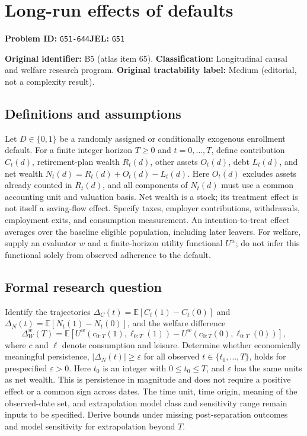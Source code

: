 \documentclass[11pt,a4paper]{article}
\begin{document}
\section*{Long-run effects of defaults}
\textbf{Problem ID:} \texttt{G51-644}\quad \textbf{JEL:} \texttt{G51}\par
\label{problem:OP-0065}
\label{atlas:prob:B5}

\noindent\textbf{Original identifier:} B5 (atlas item 65). \textbf{Classification:} Longitudinal causal and welfare research program. \textbf{Original tractability label:} Medium (editorial, not a complexity result).

\subsection*{Definitions and assumptions}

Let $D\in\{0,1\}$ be a randomly assigned or conditionally exogenous enrollment default. For a finite integer horizon $T\geq0$ and $t=0,\ldots,T$, define contribution $C_t(d)$, retirement-plan wealth $R_t(d)$, other assets $O_t(d)$, debt $L_t(d)$, and net wealth $N_t(d)=R_t(d)+O_t(d)-L_t(d)$. Here $O_t(d)$ excludes assets already counted in $R_t(d)$, and all components of $N_t(d)$ must use a common accounting unit and valuation basis. Net wealth is a stock; its treatment effect is not itself a saving-flow effect. Specify taxes, employer contributions, withdrawals, employment exits, and consumption measurement. An intention-to-treat effect averages over the baseline eligible population, including later leavers. For welfare, supply an evaluator $w$ and a finite-horizon utility functional $U^w$; do not infer this functional solely from observed adherence to the default.

\subsection*{Formal research question}

Identify the trajectories $\Delta_C(t)=\mathbb E[C_t(1)-C_t(0)]$ and $\Delta_N(t)=\mathbb E[N_t(1)-N_t(0)]$, and the welfare difference
\[
\Delta_W^w(T)=\mathbb E[U^w(c_{0:T}(1),\ell_{0:T}(1))-U^w(c_{0:T}(0),\ell_{0:T}(0))],
\]
where $c$ and $\ell$ denote consumption and leisure. Determine whether economically meaningful persistence, $|\Delta_N(t)|\geq\varepsilon$ for all observed $t\in\{t_0,\ldots,T\}$, holds for prespecified $\varepsilon>0$. Here $t_0$ is an integer with $0\leq t_0\leq T$, and $\varepsilon$ has the same units as net wealth. This is persistence in magnitude and does not require a positive effect or a common sign across dates. The time unit, time origin, meaning of the observed-date set, and extrapolation model class and sensitivity range remain inputs to be specified. Derive bounds under missing post-separation outcomes and model sensitivity for extrapolation beyond $T$.
\end{document}
